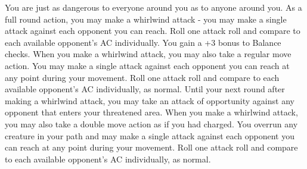 \combatfeat
{You are just as dangerous to everyone around you as to anyone around you.}
{As a full round action, you may make a whirlwind attack - you may make a single attack against each opponent you can reach. Roll one attack roll and compare to each available opponent's AC individually.}
{You gain a +3 bonus to Balance checks.}
{When you make a whirlwind attack, you may also take a regular move action. You may make a single attack against each opponent you can reach at any point during your movement. Roll one attack roll and compare to each available opponent's AC individually, as normal.}
{Until your next round after making a whirlwind attack, you may take an attack of opportunity against any opponent that enters your threatened area.}
{When you make a whirlwind attack, you may also take a double move action as if you had charged. You overrun any creature in your path and may make a single attack against each opponent you can reach at any point during your movement. Roll one attack roll and compare to each available opponent's AC individually, as normal.}